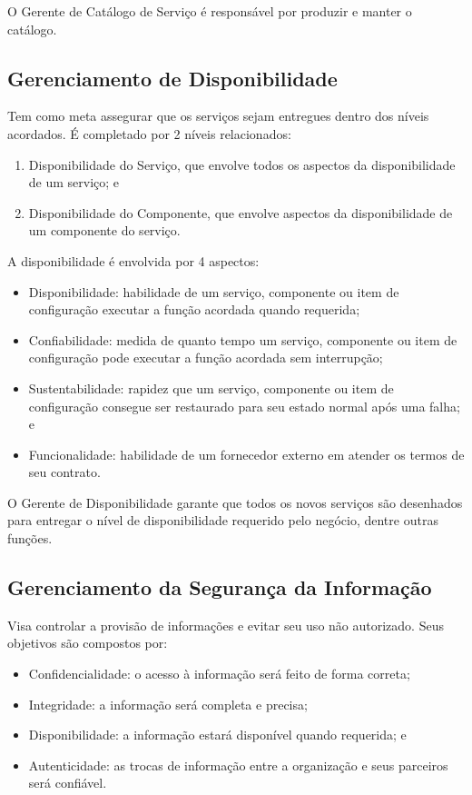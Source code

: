 O Gerente de Catálogo de Serviço é responsável por produzir e manter o
catálogo.


\subsection{Gerenciamento de Disponibilidade}
Tem como meta assegurar que os serviços sejam entregues dentro dos níveis
acordados. É completado por 2 níveis relacionados:
\begin{enumerate}
    \item Disponibilidade do Serviço, que envolve todos os aspectos da
        disponibilidade de um serviço; e
    \item Disponibilidade do Componente, que envolve aspectos da
        disponibilidade de um componente do serviço.
\end{enumerate}

A disponibilidade é envolvida por 4 aspectos:

\begin{itemize}
    \item Disponibilidade: habilidade de um serviço, componente ou item de
        configuração executar a função acordada quando requerida;
    \item Confiabilidade: medida de quanto tempo um serviço, componente ou item
        de configuração pode executar a função acordada sem interrupção;
    \item Sustentabilidade: rapidez que um serviço, componente ou item de
        configuração consegue ser restaurado para seu estado normal após uma
        falha; e
    \item Funcionalidade: habilidade de um fornecedor externo em atender os
        termos de seu contrato.
\end{itemize}

O Gerente de Disponibilidade garante que todos os novos serviços são desenhados
para entregar o nível de disponibilidade requerido pelo negócio, dentre outras
funções.


\subsection{Gerenciamento da Segurança da Informação}
Visa controlar a provisão de informações e evitar seu uso não autorizado. Seus
objetivos são compostos por:
\begin{itemize}
    \item Confidencialidade: o acesso à informação será feito de forma correta;
    \item Integridade: a informação será completa e precisa;
    \item Disponibilidade: a informação estará disponível quando requerida; e
    \item Autenticidade: as trocas de informação entre a organização e seus
        parceiros será confiável.
\end{itemize}


